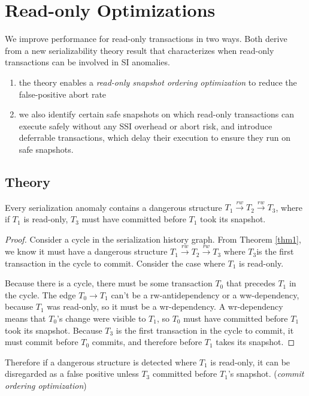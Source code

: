 \documentclass[11pt]{article}
\begin{document}
\section{Read-only Optimizations}
\label{sec:orgdee1a18}
We improve performance for read-only transactions in two ways. Both derive from a new serializability
theory result that characterizes when read-only transactions can be involved in SI  anomalies.
\begin{enumerate}
\item the theory enables a \emph{read-only snapshot ordering optimization} to reduce the false-positive abort rate
\item we also identify certain safe snapshots on which read-only transactions can execute safely without
any SSI overhead or abort risk, and introduce deferrable transactions, which delay their execution
to ensure they run on safe snapshots.
\end{enumerate}
\subsection{Theory}
\label{sec:org46199bd}
\begin{theorem}[]
Every serialization anomaly contains a dangerous structure
\(T_1\xrightarrow{rw}T_2\xrightarrow{rw}T_3\), where if \(T_1\) is read-only, \(T_3\) must have
committed before \(T_1\) took its snapshot.
\end{theorem}

\begin{proof}
Consider a cycle in the serialization history graph. From Theorem \ref{thm1}, we know it must have a
dangerous structure \(T_1\xrightarrow{rw}T_2\xrightarrow{rw}T_3\) where \(T_3\)is the first
transaction in the cycle to commit. Consider the case where \(T_1\) is read-only.

Because there is a cycle, there must be some transaction \(T_0\) that precedes \(T_1\) in the cycle.
The edge \(T_0\to T_1\) can't be a rw-antidependency or a ww-dependency, because \(T_1\) was
read-only, so it must be a wr-dependency. A wr-dependency means that \(T_0\)'s change were visible to
\(T_1\), so \(T_0\) must have committed before \(T_1\) took its snapshot. Because \(T_3\) is the first
transaction in the cycle to commit, it must commit before \(T_0\) commits, and therefore before
\(T_1\) takes its snapshot.
\end{proof}

Therefore if a dangerous structure is detected where \(T_1\) is read-only, it can be disregarded as a
false positive unless \(T_3\) committed before \(T_1\)'s snapshot. (\emph{commit ordering optimization})
\end{document}

